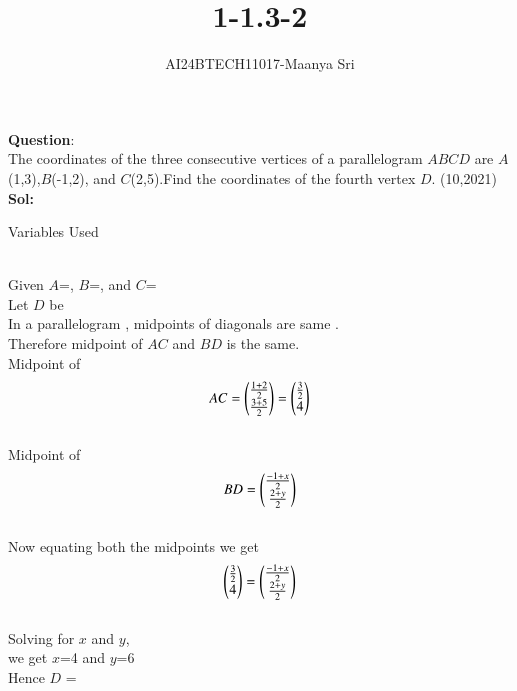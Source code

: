 \documentclass[journal]{IEEEtran}
\begin{document}

\vspace{3cm}

\title{1-1.3-2}
\author{AI24BTECH11017-Maanya Sri
}
{\let\newpage\relax\maketitle}

\renewcommand{\thefigure}{\theenumi}
\renewcommand{\thetable}{\theenumi}
\setlength{\intextsep}{10pt} %


\renewcommand{\thetable}{\theenumi}
\textbf{Question}:\\
The coordinates of the three consecutive vertices of a parallelogram $ABCD$ are $A$ (1,3),$B$(-1,2), and $C$(2,5).Find the coordinates of the fourth vertex $D$.
\hfill(10,2021)
\\ \textbf{Sol:}
\begin{table}[h!]
	\centering
	
	\caption{Variables Used}
	\label{tab1.3.2.1}
\end{table}
\\ Given $A$=,
$B$=, and
$C$=
\\ Let $D$ be 
\\ In a parallelogram , midpoints of diagonals are same .
\\ Therefore midpoint of $AC$ and $BD$ is the same.
\\  Midpoint of
\begin{align}
	AC=\begin{pmatrix}
\frac{1+2}{2}
\\
\frac{3+5}{2}
\end{pmatrix} = \begin{pmatrix}
\frac{3}{2}
\\
4\end{pmatrix}
\end{align}
\\ Midpoint of
\begin{align}
	BD=\begin{pmatrix}
\frac{-1+x}{2}
\\
\frac{2+y}{2}
\end{pmatrix}\end{align}
\\ Now equating both the midpoints we get
\\\begin{align} \begin{pmatrix}
\frac{3}{2}
\\
4
\end{pmatrix} = \begin{pmatrix}
\frac{-1+x}{2}
\\
\frac{2+y}{2}
\end{pmatrix}\end{align}
\\ Solving for $x$ and $y$,
\\ we get $x$=4 and $y$=6
\\ Hence $D$ = 
\end{document}
